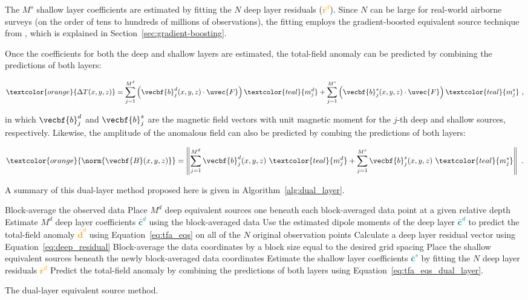 The $M^s$ shallow layer coefficients are estimated by fitting the $N$ deep layer residuals (\textcolor{orange}{$\bar{\mathbf{r}}^d$}). Since $N$ can be large for real-world airborne surveys (on the order of tens to hundreds of millions of observations), the fitting employs the gradient-boosted equivalent source technique from \citet{Soler2021}, which is explained in Section~\ref{sec:gradient-boosting}.

Once the coefficients for both the deep and shallow layers are estimated, the total-field anomaly can be predicted by combining the predictions of both layers:

\begin{equation}
    \label{eq:tfa_eqs_dual_layer}
    \textcolor{orange}{\Delta T (x, y, z)} =
    \sum_{j=1}^{M^d} \left(
        \vecbf{b}^d_j(x, y, z) \cdot \uvec{F}
    \right) \textcolor{teal}{m_j^d}
    + \sum_{j=1}^{M^s} \left(
        \vecbf{b}^s_j(x, y, z) \cdot \uvec{F}
    \right) \textcolor{teal}{m_j^s}
  \ ,
\end{equation}

\noindent
in which $\vecbf{b}_j^d$ and $\vecbf{b}_j^s$ are the magnetic field vectors with unit magnetic moment for the $j$-th deep and shallow sources, respectively. Likewise, the amplitude of the anomalous field can also be predicted by combing the predictions of both layers:

\begin{equation}
  \textcolor{orange}{\norm{\vecbf{B}(x,y,z)}} =
  \left\lVert \sum_{j=1}^{M^d} \vecbf{b}^d_{j}(x,y,z)\ \textcolor{teal}{m^d_j}
  +
  \sum_{j=1}^{M^s}  \vecbf{b}^s_{j}(x,y,z)\ \textcolor{teal}{m^s_j}
  \right\rVert
  \ .
\end{equation}

\noindent
A summary of this dual-layer method proposed here is given in Algorithm~\ref{alg:dual_layer}.

\begin{algorithm}[!htb]
  Block-average the observed data
  \;
  Place $M^d$ deep equivalent sources one beneath each block-averaged data point at a given relative depth
  \;
  Estimate $M^d$ deep layer coefficients \textcolor{teal}{$\bar{\mathbf{c}}^d$} using the block-averaged data
  \;
  Use the estimated dipole moments of the deep layer \textcolor{teal}{$\bar{\mathbf{c}}^d$} to predict the total-field anomaly \textcolor{orange}{$\bar{\mathbf{d}}^d$} using Equation~\ref{eq:tfa_eqs} on all of the $N$ original observation points
  \;
  Calculate a deep layer residual vector using Equation~\ref{eq:deep_residual}
  \;
  Block-average the data coordinates by a block size equal to the desired grid spacing
  \;
  Place the shallow equivalent sources beneath the newly block-averaged data coordinates
  \;
  Estimate the shallow layer coefficients \textcolor{teal}{$\bar{\mathbf{c}}^s$} by fitting the $N$ deep layer residuals \textcolor{orange}{$\bar{\mathbf{r}}^d$}
  \;
   Predict the total-field anomaly by combining the predictions of both layers using Equation~\ref{eq:tfa_eqs_dual_layer}.
  \BlankLine
  \caption{The dual-layer equivalent source method.}
  \label{alg:dual_layer}
\end{algorithm}


